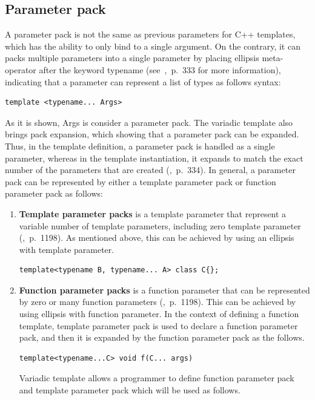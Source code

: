 \documentclass[11pt]{report}
\begin{document}
\subsection{Parameter pack}
\label{subsection: Parameter pack}
A parameter pack is not the same as previous parameters for C++ templates, which has the ability to only bind to a single argument. On the contrary, it can packs multiple parameters into a single parameter by placing ellipsis meta-operator after the keyword typename (see~\cite{Prata:2012:Cpp},~p.~333 for more information), indicating that a parameter can represent a list of types as follows syntax:
\begin{lstlisting}
template <typename... Args>
\end{lstlisting}
As it is shown, Args is consider a parameter pack. The variadic template also brings pack expansion, which showing that a parameter pack can be expanded. Thus, in the template definition, a parameter pack is handled as a single parameter, whereas in the template instantiation, it expands to match the exact number of the parameters that are created (\cite{Prata:2012:Cpp},~p.~334). In general, a parameter pack can be represented by either a template parameter pack or function parameter pack as follows:

\begin{enumerate}
\item \textbf{Template parameter packs} is a template parameter that represent a variable number of template parameters, including zero template parameter (\cite{Prata:2012:Cpp},~p.~1198). As mentioned above, this can be achieved by using an ellipsis with template parameter.
\begin{lstlisting}
template<typename B, typename... A> class C{}; 
\end{lstlisting}


\item \textbf{Function parameter packs} is a function parameter that can be represented by zero or many function parameters (\cite{Prata:2012:Cpp},~p.~1198). This can be achieved by using ellipsis with function parameter. In the context of defining a function template, template parameter pack is used to declare a function parameter pack, and then it is expanded by the function parameter pack as the follows.
\begin{lstlisting}
template<typename...C> void f(C... args)
\end{lstlisting}
Variadic template allows a programmer to define function parameter pack and template parameter pack which will be used as follows.

\end{enumerate}
\end{document}
